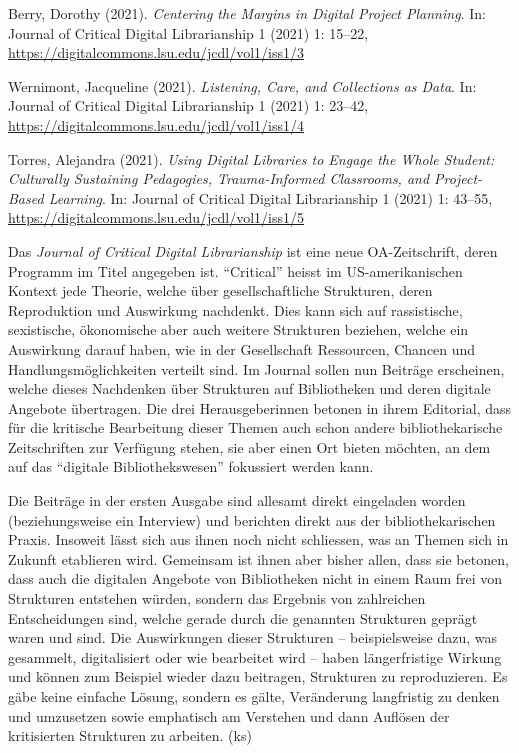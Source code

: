 \documentclass[a4paper,
fontsize=11pt,
oneside,
numbers=noperiodatend,
parskip=half-,
bibliography=totoc,
final
]{scrartcl}
\begin{document}
Berry, Dorothy (2021). \emph{Centering the Margins in Digital Project
Planning}. In: Journal of Critical Digital Librarianship 1 (2021) 1:
15--22, \url{https://digitalcommons.lsu.edu/jcdl/vol1/iss1/3}

Wernimont, Jacqueline (2021). \emph{Listening, Care, and Collections as
Data}. In: Journal of Critical Digital Librarianship 1 (2021) 1: 23--42,
\url{https://digitalcommons.lsu.edu/jcdl/vol1/iss1/4}

Torres, Alejandra (2021). \emph{Using Digital Libraries to Engage the
Whole Student: Culturally Sustaining Pedagogies, Trauma-Informed
Classrooms, and Project-Based Learning}. In: Journal of Critical Digital
Librarianship 1 (2021) 1: 43--55,
\url{https://digitalcommons.lsu.edu/jcdl/vol1/iss1/5}

Das \emph{Journal of Critical Digital Librarianship} ist eine neue
OA-Zeitschrift, deren Programm im Titel angegeben ist.
\enquote{Critical} heisst im US-amerikanischen Kontext jede Theorie,
welche über gesellschaftliche Strukturen, deren Reproduktion und
Auswirkung nachdenkt. Dies kann sich auf rassistische, sexistische,
ökonomische aber auch weitere Strukturen beziehen, welche ein Auswirkung
darauf haben, wie in der Gesellschaft Ressourcen, Chancen und
Handlungsmöglichkeiten verteilt sind. Im Journal sollen nun Beiträge
erscheinen, welche dieses Nachdenken über Strukturen auf Bibliotheken
und deren digitale Angebote übertragen. Die drei Herausgeberinnen
betonen in ihrem Editorial, dass für die kritische Bearbeitung dieser
Themen auch schon andere bibliothekarische Zeitschriften zur Verfügung
stehen, sie aber einen Ort bieten möchten, an dem auf das
\enquote{digitale Bibliothekswesen} fokussiert werden kann.

Die Beiträge in der ersten Ausgabe sind allesamt direkt eingeladen
worden (beziehungsweise ein Interview) und berichten direkt aus der
bibliothekarischen Praxis. Insoweit lässt sich aus ihnen noch nicht
schliessen, was an Themen sich in Zukunft etablieren wird. Gemeinsam ist
ihnen aber bisher allen, dass sie betonen, dass auch die digitalen
Angebote von Bibliotheken nicht in einem Raum frei von Strukturen
entstehen würden, sondern das Ergebnis von zahlreichen Entscheidungen
sind, welche gerade durch die genannten Strukturen geprägt waren und
sind. Die Auswirkungen dieser Strukturen -- beispielsweise dazu, was
gesammelt, digitalisiert oder wie bearbeitet wird -- haben
längerfristige Wirkung und können zum Beispiel wieder dazu beitragen,
Strukturen zu reproduzieren. Es gäbe keine einfache Lösung, sondern es
gälte, Veränderung langfristig zu denken und umzusetzen sowie emphatisch
am Verstehen und dann Auflösen der kritisierten Strukturen zu arbeiten.
(ks)
\end{document}
